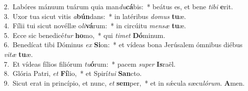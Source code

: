 {2.~}Labóres mánuum tuárum quia man\textit{du}\textbf{cá}bis:~* beátus es, et bene \textit{ti}\textit{bi} \textbf{e}rit.\\
{3.~}Uxor tua sicut vitis \textit{a}\textbf{bún}dans:~* in latéribus \textit{do}\textit{mus} \textbf{tu}æ.\\
{4.~}Fílii tui sicut novéllæ o\textit{li}\textbf{vá}rum:~* in circúitu \textit{men}\textit{sæ} \textbf{tu}æ.\\
{5.~}Ecce sic benedicé\textit{tur} \textbf{ho}mo,~* qui \textit{ti}\textit{met} \textbf{Dó}minum.\\
{6.~}Benedícat tibi Dóminus \textit{ex} \textbf{Si}on:~* et vídeas bona Jerúsalem ómnibus diébus \textit{vi}\textit{tæ} \textbf{tu}æ.\\
{7.~}Et vídeas fílios filiórum \textit{tu}\textbf{ó}rum:~* pacem \textit{su}\textit{per} \textbf{Is}raël.\\
{8.~}Glória Patri, \textit{et} \textbf{Fí}lio,~* et Spirí\textit{tu}\textit{i} \textbf{San}cto.\\
{9.~}Sicut erat in princípio, et nunc, \textit{et} \textbf{sem}per,~* et in sǽcula sæcu\textit{ló}\textit{rum}. \textbf{A}men.\\
